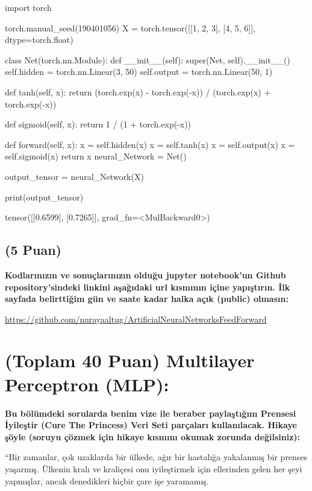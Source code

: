 \documentclass[11pt]{article}
\begin{document}
\begin{python}
import torch


torch.manual_seed(190401056)
X = torch.tensor([[1, 2, 3], [4, 5, 6]], dtype=torch.float)

class Net(torch.nn.Module):
    def __init__(self):
        super(Net, self).__init__()
        self.hidden = torch.nn.Linear(3, 50)
        self.output = torch.nn.Linear(50, 1)
        
    def tanh(self, x):
        return (torch.exp(x) - torch.exp(-x)) / (torch.exp(x) + torch.exp(-x))
    
    def sigmoid(self, x):
        return 1 / (1 + torch.exp(-x))
        
    def forward(self, x):
        x = self.hidden(x)
        x = self.tanh(x)
        x = self.output(x)
        x = self.sigmoid(x)
        return x
neural_Network = Net()

output_tensor = neural_Network(X)

print(output_tensor)
     
\end{python}
tensor([[0.6599],
        [0.7265]], grad_fn=<MulBackward0>)

\subsection{(5 Puan)} \textbf{Kodlarınızın ve sonuçlarınızın olduğu jupyter notebook'un Github repository'sindeki linkini aşağıdaki url kısmının içine yapıştırın. İlk sayfada belirttiğim gün ve saate kadar halka açık (public) olmasın:}

\url{https://github.com/nurayaaltug/ArtificialNeuralNetworksFeedForward}

\section{(Toplam 40 Puan) Multilayer Perceptron (MLP):} 
\textbf{Bu bölümdeki sorularda benim vize ile beraber paylaştığım Prensesi İyileştir (Cure The Princess) Veri Seti parçaları kullanılacak. Hikaye şöyle (soruyu çözmek için hikaye kısmını okumak zorunda değilsiniz):} 

``Bir zamanlar, çok uzaklarda bir ülkede, ağır bir hastalığa yakalanmış bir prenses yaşarmış. Ülkenin kralı ve kraliçesi onu iyileştirmek için ellerinden gelen her şeyi yapmışlar, ancak denedikleri hiçbir çare işe yaramamış.
\end{document}
